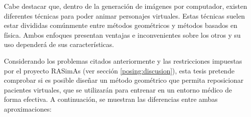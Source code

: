  
Cabe destacar que, dentro de la generación de imágenes por computador, existen diferentes técnicas para poder animar personajes virtuales.
Estas técnicas suelen estar divididas comúnmente entre métodos geométricos y métodos basados en física. Ambos enfoques presentan ventajas e inconvenientes sobre los otros y su uso dependerá de sus características. 

Considerando los problemas citados anteriormente y las restricciones impuestas por el proyecto \ac{RASimAs} (ver sección \ref{posing:discusion}), esta tesis pretende comprobar si es posible diseñar un método geométrico que permita reposicionar pacientes virtuales, que se utilizarán para entrenar en un entorno médico de forma efectiva. A continuación, se muestran las diferencias entre ambas aproximaciones:

